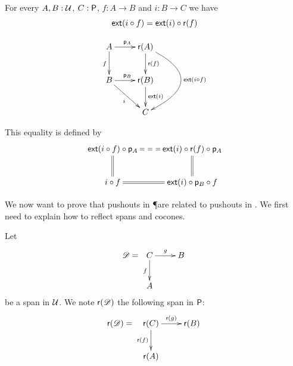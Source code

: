 


\begin{defn}
  For every $A,B:\type$, $C:\P$, $f:A\to{}B$ and $i:B\to{}C$ we have
  \[\ext(i\circ{}f)=\ext(i)\circ\reflect(f)\]

  \[\xymatrix{
    A \ar^{\project_A}[r] \ar_f[d] & \reflect(A) \ar^{\reflect(f)}[d]
    \ar@/^15mm/^{\ext(i\circ f)}[dd] \\
    B \ar^{\project_B}[r] \ar_i[rd] & \reflect(B) \ar^{\ext(i)}[d] \\
    & C}\]

  This equality is defined by
  \[\xymatrix{
    \ext(i\circ f)\circ\project_A \ar@{==}[r] \ar@{=}[d] &
    \ext(i)\circ\reflect(f)\circ\project_A \ar@{=}[d] \\
    i\circ f \ar@{=}[r] & \ext(i)\circ\project_B\circ f
  }\]

\end{defn}



We now want to prove that pushouts in \P are related to pushouts in \type. We
first need to explain how to reflect spans and cocones.

\begin{defn}
  Let
  \[\Ddiag=\xymatrix{C \ar^g[r] \ar_f[d] & B \\ A & }\]
  be a span in $\type$. We note $\reflect(\Ddiag)$ the following
  span in $\P$:
  \[\reflect(\Ddiag)=\xymatrix{\reflect(C) \ar^{\reflect(g)}[r]
    \ar_{\reflect(f)}[d] & \reflect(B) \\ \reflect(A) & }\]
\end{defn}

